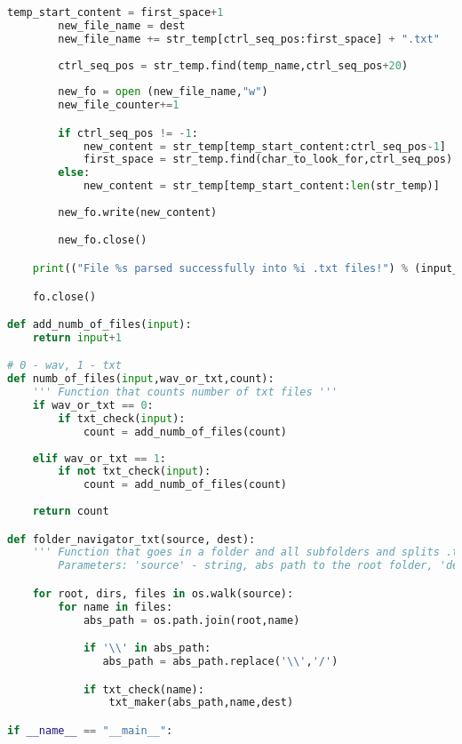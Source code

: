 \begin{lstlisting}[language=Python, flexiblecolumns=true, caption=txtFileMaker code.]
        temp_start_content = first_space+1
        new_file_name = dest
        new_file_name += str_temp[ctrl_seq_pos:first_space] + ".txt"     
        
        ctrl_seq_pos = str_temp.find(temp_name,ctrl_seq_pos+20)
                      
        new_fo = open (new_file_name,"w")
        new_file_counter+=1

        if ctrl_seq_pos != -1:        
            new_content = str_temp[temp_start_content:ctrl_seq_pos-1]
            first_space = str_temp.find(char_to_look_for,ctrl_seq_pos)
        else:
            new_content = str_temp[temp_start_content:len(str_temp)]            # could be problematic, maybe
        
        new_fo.write(new_content)

        new_fo.close()

    print(("File %s parsed successfully into %i .txt files!") % (input_name, new_file_counter))

    fo.close()

def add_numb_of_files(input):
    return input+1

# 0 - wav, 1 - txt
def numb_of_files(input,wav_or_txt,count):
    ''' Function that counts number of txt files '''
    if wav_or_txt == 0:
        if txt_check(input):
            count = add_numb_of_files(count)
        
    elif wav_or_txt == 1:
        if not txt_check(input):
            count = add_numb_of_files(count)
    
    return count 

def folder_navigator_txt(source, dest):
    ''' Function that goes in a folder and all subfolders and splits .txt files into multiple .txt files so that the .wav files and .txt files are 1 to 1 pairs.
        Parameters: 'source' - string, abs path to the root folder, 'dest' - string, abs path to dest folder (both must be with a '/' at the end!) '''

    for root, dirs, files in os.walk(source):
        for name in files:
            abs_path = os.path.join(root,name)

            if '\\' in abs_path:
               abs_path = abs_path.replace('\\','/')

            if txt_check(name):
                txt_maker(abs_path,name,dest)

if __name__ == "__main__":
    

\end{lstlisting}
